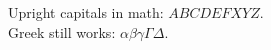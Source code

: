 \documentclass{article}
\begin{document}
Upright capitals in math: $ABCDEFXYZ$.\\
Greek still works: $\alpha\beta\gamma\Gamma\Delta$.
\end{document}
